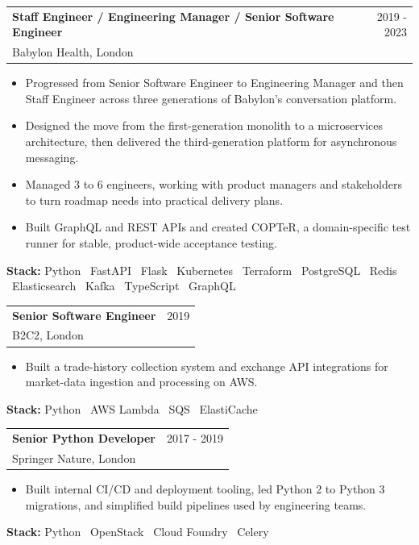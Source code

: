 \documentclass[10pt,a4paper]{article}
\makeatletter
\newcommand{\roleheading}[3]{
  \begin{tabularx}{\textwidth}{@{}Xr@{}}
    {\bfseries\color{Heading} #1} & {\small\color{Muted} #3} \\
    {\small\color{Muted} #2} & \\
  \end{tabularx}
}
\makeatother
\begin{document}
\roleheading{Staff Engineer / Engineering Manager / Senior Software Engineer}{Babylon Health, London}{2019 - 2023}
\begin{itemize}

  \item {\small Progressed from Senior Software Engineer to Engineering Manager and then Staff Engineer across three generations of Babylon's conversation platform.
}

  \item {\small Designed the move from the first-generation monolith to a microservices architecture, then delivered the third-generation platform for asynchronous messaging.
}

  \item {\small Managed 3 to 6 engineers, working with product managers and stakeholders to turn roadmap needs into practical delivery plans.
}

  \item {\small Built GraphQL and REST APIs and created COPTeR, a domain-specific test runner for stable, product-wide acceptance testing.
}

\end{itemize}
{\small\color{Muted}\textbf{Stack:} Python \textbar\ FastAPI \textbar\ Flask \textbar\ Kubernetes \textbar\ Terraform \textbar\ PostgreSQL \textbar\ Redis \textbar\ Elasticsearch \textbar\ Kafka \textbar\ TypeScript \textbar\ GraphQL}\par
\vspace{0.65em}


\roleheading{Senior Software Engineer}{B2C2, London}{2019}
\begin{itemize}

  \item {\small Built a trade-history collection system and exchange API integrations for market-data ingestion and processing on AWS.
}

\end{itemize}
{\small\color{Muted}\textbf{Stack:} Python \textbar\ AWS Lambda \textbar\ SQS \textbar\ ElastiCache}\par
\vspace{0.65em}


\roleheading{Senior Python Developer}{Springer Nature, London}{2017 - 2019}
\begin{itemize}

  \item {\small Built internal CI/CD and deployment tooling, led Python 2 to Python 3 migrations, and simplified build pipelines used by engineering teams.
}

\end{itemize}
{\small\color{Muted}\textbf{Stack:} Python \textbar\ OpenStack \textbar\ Cloud Foundry \textbar\ Celery}\par
\vspace{0.65em}
\end{document}
